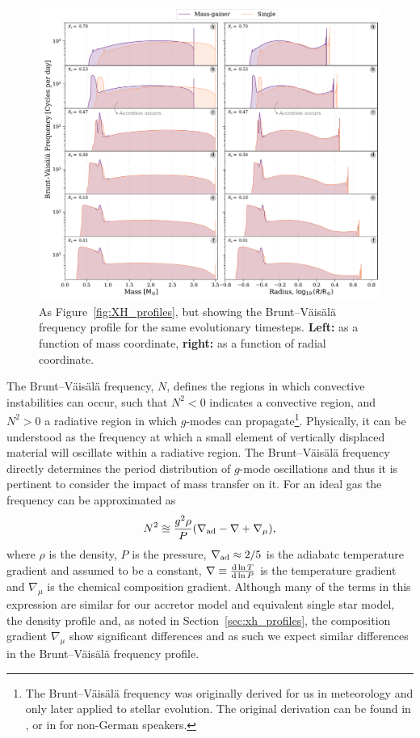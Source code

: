 \documentclass[twocolumn, twocolappendix, oneside]{aastex631}
\newcommand{\bvf}{Brunt–Väisälä frequency\xspace}
\newcommand{\gmode}{$g$-mode\xspace}
\newcommand{\gmodes}{$g$-modes\xspace}
\begin{document}
\begin{figure}
    \centering
    \includegraphics[width=\textwidth]{figures/BV_profile_all_combo.pdf}
    \caption{As Figure~\ref{fig:XH_profiles}, but showing the \bvf profile for the same evolutionary timesteps. \textbf{Left:} as a function of mass coordinate, \textbf{right:} as a function of radial coordinate.}
    \label{fig:BV_profiles}
\end{figure}

The \bvf \citep{BVF-vaisala, BVF-brunt}, $N$, defines the regions in which convective instabilities can occur, such that $N^2 < 0$ indicates a convective region, and $N^2 > 0$ a radiative region in which \gmodes can propagate\footnote{The \bvf was originally derived for us in meteorology and only later applied to stellar evolution. The original derivation can be found in \citet{BVF-vaisala}, or in \citet{BVF-brunt} for non-German speakers.}.
Physically, it can be understood as the frequency at which a small element of vertically displaced material will oscillate within a radiative region.
The \bvf directly determines the period distribution of \gmode oscillations and thus it is pertinent to consider the impact of mass transfer on it. For an ideal gas the frequency can be approximated as
\begin{equation}\label{eq:bvf}
    N^2 \approxeq \frac{g^2 \rho}{P} \qty(\nabla_{\rm ad} - \nabla + \nabla_\mu),
\end{equation}
where $\rho$ is the density, $P$ is the pressure, $\nabla_{\rm ad} \approx 2/5$ is the adiabatc temperature gradient and assumed to be a constant, $\nabla \equiv \dv{\ln T}{\ln P}$ is the temperature gradient and $\nabla_\mu$ is the chemical composition gradient. Although many of the terms in this expression are similar for our accretor model and equivalent single star model, the density profile and, as noted in Section~\ref{sec:xh_profiles}, the composition gradient $\nabla_\mu$ show significant differences and as such we expect similar differences in the \bvf profile.
\end{document}
